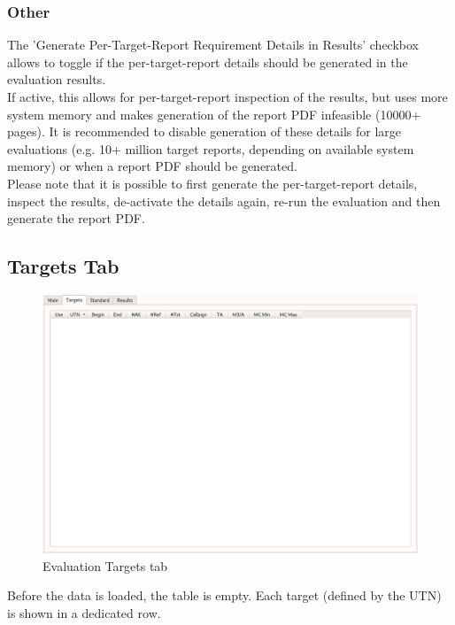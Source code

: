 \subsubsection{Other}

The 'Generate Per-Target-Report Requirement Details in Results' checkbox allows to toggle if the per-target-report details should be generated in the evaluation results. \\

If active, this allows for per-target-report inspection of the results, but uses more system memory and makes generation of the report PDF infeasible (10000+ pages). It is recommended to disable generation of these details for large evaluations (e.g. 10+ million target reports, depending on available system memory) or when a report PDF should be generated. \\

Please note that it is possible to first generate the per-target-report details, inspect the results, de-activate the details again, re-run the evaluation and then generate the report PDF.

\subsection{Targets Tab}

\begin{figure}[H]
  \hspace*{-2cm}
    \includegraphics[width=18cm,frame]{../screenshots/eval_targets_empty.png}
  \caption{Evaluation Targets tab}
\end{figure}

Before the data is loaded, the table is empty. Each target (defined by the UTN) is shown in a dedicated row. \\

